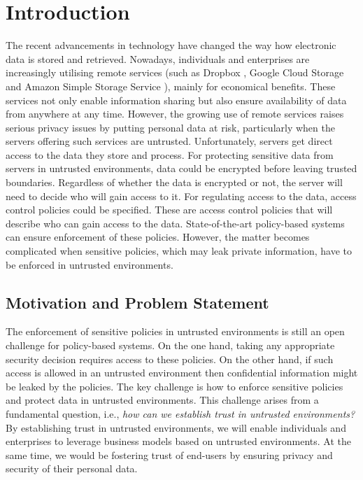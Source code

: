 \documentclass[epsfig,a4paper,11pt,titlepage]{book}
\newcommand{\clearemptydoublepage}{\newpage{\pagestyle{empty}\cleardoublepage}}
\numberwithin{algorithm}{chapter}
\begin{document}
\clearemptydoublepage

\pagestyle{fancy}






\chapter{Introduction}
\label{cha:intro}



The recent advancements in technology have changed the way how electronic data is stored and retrieved. Nowadays, individuals and enterprises are increasingly utilising remote services (such as Dropbox \cite{Dropbox}, Google Cloud Storage \cite{Google:2013} and Amazon Simple Storage Service \cite{Amazon:2013}), mainly for economical benefits. These services not only enable information sharing but also ensure availability of data from anywhere at any time. However, the growing use of remote services raises serious privacy issues by putting personal data at risk, particularly when the servers offering such services are untrusted. Unfortunately, servers get direct access to the data they store and process. For protecting sensitive data from servers in untrusted environments, data could be encrypted before leaving trusted boundaries. Regardless of whether the data is encrypted or not, the server will need to decide who will gain access to it. For regulating access to the data, access control policies could be specified. These are access control policies that will describe who can gain access to the data. State-of-the-art policy-based systems can ensure enforcement of these policies. However, the matter becomes complicated when sensitive policies, which may leak private information, have to be enforced in untrusted environments.

\section{Motivation and Problem Statement}
\label{sec:intro-motivation}

The enforcement of sensitive policies in untrusted environments is still an open challenge for policy-based systems. On the one hand, taking any appropriate security decision requires access to these policies. On the other hand, if such access is allowed in an untrusted environment then confidential information might be leaked by the policies. The key challenge is how to enforce sensitive policies and protect data in untrusted environments. This challenge arises from a fundamental question, i.e., \emph{how can we establish trust in untrusted environments?} By establishing trust in untrusted environments, we will enable individuals and enterprises to leverage business models based on untrusted environments. At the same time, we would be fostering trust of end-users by ensuring privacy and security of their personal data.
\end{document}
